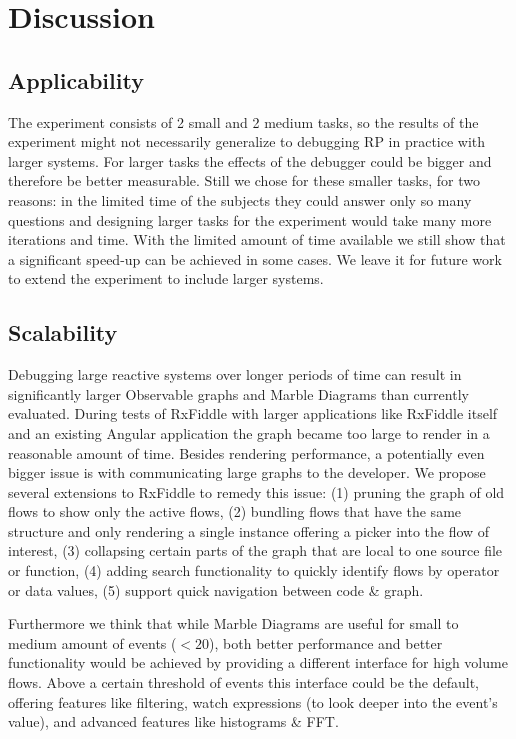 \section{Discussion}
\subsection{Applicability}
The experiment consists of 2 small and 2 medium tasks, so the results of the experiment might not necessarily generalize to debugging RP in practice with larger systems. For larger tasks the effects of the debugger could be bigger and therefore be better measurable. Still we chose for these smaller tasks, for two reasons: in the limited time of the subjects they could answer only so many questions and designing larger tasks for the experiment would take many more iterations and time. With the limited amount of time available we still show that a significant speed-up can be achieved in some cases. We leave it for future work to extend the experiment to include larger systems.

\subsection{Scalability}
Debugging large reactive systems over longer periods of time can result in significantly larger Observable graphs and Marble Diagrams than currently evaluated. During tests of RxFiddle with larger applications like RxFiddle itself and an existing Angular application the graph became too large to render in a reasonable amount of time. Besides rendering performance, a potentially even bigger issue is with communicating large graphs to the developer. We propose several extensions to RxFiddle to remedy this issue: (1) pruning the graph of old flows to show only the active flows, (2) bundling flows that have the same structure and only rendering a single instance offering a picker into the flow of interest, (3) collapsing certain parts of the graph that are local to one source file or function, (4) adding search functionality to quickly identify flows by operator or data values, (5) support quick navigation between code \& graph.

Furthermore we think that while Marble Diagrams are useful for small to medium amount of events ($< 20$), both better performance and better functionality would be achieved by providing a different interface for high volume flows. Above a certain threshold of events this interface could be the default, offering features like filtering, watch expressions (to look deeper into the event's value), and advanced features like histograms \& FFT.


